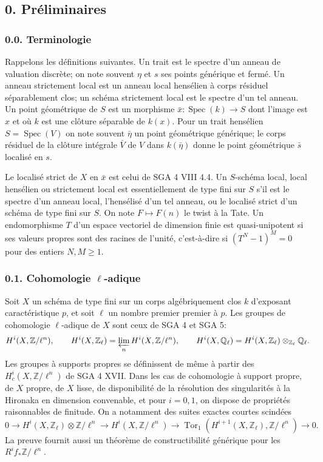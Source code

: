 \documentclass[11pt]{article}
\providecommand{\Spec}{\operatorname{Spec}}
\providecommand{\Tor}{\operatorname{Tor}}
\providecommand{\Z}{\mathbb Z}
\providecommand{\Ql}{\mathbb Q_\ell}
\providecommand{\Zl}{\mathbb Z_\ell}
\providecommand{\limproj}{\varprojlim}
\begin{document}
\subsection*{0. Préliminaires}
\subsubsection*{0.0. Terminologie}
Rappelons les définitions suivantes. Un trait est le spectre d'un anneau de valuation discrète; on note souvent $\eta$ et $s$ ses points générique et fermé. Un anneau strictement local est un anneau local hensélien à corps résiduel séparablement clos; un schéma strictement local est le spectre d'un tel anneau. Un point géométrique de $S$ est un morphisme $\bar x:\Spec(k)\to S$ dont l'image est $x$ et où $k$ est une clôture séparable de $k(x)$. Pour un trait hensélien $S=\Spec(V)$ on note souvent $\bar\eta$ un point géométrique générique; le corps résiduel de la clôture intégrale $\bar V$ de $V$ dans $k(\bar\eta)$ donne le point géométrique $\bar s$ localisé en $s$.

Le localisé strict de $X$ en $\bar x$ est celui de SGA 4 VIII 4.4. Un $S$-schéma local, local hensélien ou strictement local est essentiellement de type fini sur $S$ s'il est le spectre d'un anneau local, l'hensélisé d'un tel anneau, ou le localisé strict d'un schéma de type fini sur $S$. On note $F\mapsto F(n)$ le twist à la Tate. Un endomorphisme $T$ d'un espace vectoriel de dimension finie est quasi-unipotent si ses valeurs propres sont des racines de l'unité, c'est-à-dire si $(T^N-1)^M=0$ pour des entiers $N,M\ge1$.

\subsubsection*{0.1. Cohomologie $\ell$-adique}
Soit $X$ un schéma de type fini sur un corps algébriquement clos $k$ d'exposant caractéristique $p$, et soit $\ell$ un nombre premier premier à $p$. Les groupes de cohomologie $\ell$-adique de $X$ sont ceux de SGA 4 et SGA 5:
\[
H^i(X,\Z/\ell^n),\qquad H^i(X,\Zl)=\limproj_nH^i(X,\Z/\ell^n),\qquad H^i(X,\Ql)=H^i(X,\Zl)\otimes_{\Zl}\Ql.
\]
Les groupes à supports propres se définissent de même à partir des $H^i_c(X,\Z/\ell^n)$ de SGA 4 XVII. Dans les cas de cohomologie à support propre, de $X$ propre, de $X$ lisse, de disponibilité de la résolution des singularités à la Hironaka en dimension convenable, et pour $i=0,1$, on dispose de propriétés raisonnables de finitude. On a notamment des suites exactes courtes scindées
\[
0\to H^i(X,\Zl)\otimes\Z/\ell^n\to H^i(X,\Z/\ell^n)\to \Tor_1(H^{i+1}(X,\Zl),\Z/\ell^n)\to0.
\]
La preuve fournit aussi un théorème de constructibilité générique pour les $R^if_*\Z/\ell^n$.
\end{document}
